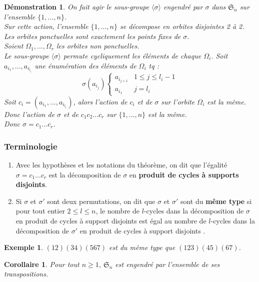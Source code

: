 \documentclass[a4paper, oneside]{report}
\theoremstyle{break}
\newtheorem{cor}[thm]{Corollaire}
\newtheorem{exem}[thm]{Exemple}
\newtheorem*{demo}{Démonstration}
\newcommand{\pcsd}{produit de cycles à support disjoints }
\renewcommand{\S}{\mathfrak{S}}
\begin{document}
\begin{demo}
	On fait agir le sous-groupe $\langle \sigma\rangle$ engendré par $\sigma$ dans $\S_n$ sur l'ensemble $\{1,...,n\}$.\\
	Sur cette action, l'ensemble $\{1,...,n\}$ se décompose en orbites disjointes 2 à 2. Les orbites ponctuelles sont exactement les points fixes de $\sigma$.\\
	Soient $\Omega_1,...,\Omega_r$ les orbites non ponctuelles.\\
	Le sous-groupe $\langle \sigma\rangle$ permute cycliquement les éléments de chaque $\Omega_i$. Soit $a_{i_1},...,a_{i_{l_i}}$ une énumération des éléments de $\Omega_i$ tq :
	$$\sigma(a_{i_j})\left\{\begin{array}{ll}
	a_{i_{j+1}}&1\leq j \leq l_i-1\\
	a_{i_1}&j=l_i
	\end{array}\right. $$
	Soit $c_i=(a_{i_1},...,a_{i_{l_i}})$, alors l'action de $c_i$ et de $\sigma$ sur l'orbite $\Omega_i$ est la même.\\
	Donc l'action de $\sigma$ et de $c_1c_2...c_r$ sur $\{1,...,n\}$ est la même.\\
	Donc $\sigma=c_1...c_r$.
\end{demo}

\subsubsection{Terminologie}
\begin{enumerate}
\item Avec les hypothèses et les notations du théorème, on dit que l'égalité $\sigma=c_1...c_r$ est la décomposition de $\sigma$ en \textbf{produit de cycles à supports disjoints}.

\item Si $\sigma$ et $\sigma '$ sont deux permutations, on dit que $\sigma$ et $\sigma '$ sont du \textbf{même type} si pour tout entier $2\leq l \leq n$, le nombre de $l$-cycles dans la décomposition de $\sigma$ en produit de cycles à support disjoints est égal au nombre de $l$-cycles dans la décomposition de $\sigma '$ en \pcsd.
\end{enumerate}

\begin{exem}
	$(12)(34)(567)$ est du même type que $(123)(45)(67)$.
\end{exem}

\begin{cor}
	Pour tout $n\geq 1$, $\S_n$ est engendré par l'ensemble de ses transpositions.
\end{cor}
\end{document}
